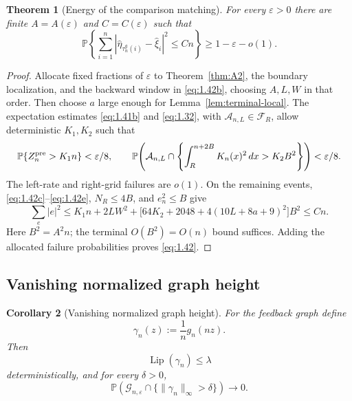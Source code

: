 \documentclass[11pt,reqno]{amsart}
\newtheorem{theorem}{Theorem}[section]
\newtheorem{corollary}[theorem]{Corollary}
\theoremstyle{definition}
\theoremstyle{remark}
\numberwithin{equation}{section}
\newcommand{\Pp}{\mathbb P}
\newcommand{\Lip}{\operatorname{Lip}}
\begin{document}
\begin{theorem}[Energy of the comparison matching]
\label{thm:I3}
For every \(\varepsilon>0\) there are finite
\(A=A(\varepsilon)\) and \(C=C(\varepsilon)\) such that
\begin{equation}
\boxed{\Pp\left\{\sum_{i=1}^n
|\widehat\eta_{\tau_n^g(i)}-\widehat\xi_i|^2\le Cn\right\}
\ge1-\varepsilon-o(1).}
\label{eq:1.42}
\end{equation}
\end{theorem}

\begin{proof}
Allocate fixed fractions of \(\varepsilon\) to Theorem~\ref{thm:A2},
the boundary localization,
and the backward window in \eqref{eq:1.42b}, choosing \(A,L,W\) in that order.
Then choose \(a\) large enough for Lemma~\ref{lem:terminal-local}.
The expectation estimates \eqref{eq:1.41b} and \eqref{eq:1.32}, with
\(\mathcal A_{n,L}\in\mathcal F_R\), allow deterministic \(K_1,K_2\) such that
\begin{equation}
\Pp\{Z_n^{\rm pre}>K_1n\}<\varepsilon/8,\qquad
\Pp\!\left(\mathcal A_{n,L}\cap
\left\{\int_R^{n+2B}K_n(x)^2\,dx>K_2B^2\right\}\right)<\varepsilon/8.
\label{eq:1.42e}
\end{equation}
The left-rate and right-grid failures are \(o(1)\).  On the remaining
events, \eqref{eq:1.42c}--\eqref{eq:1.42e}, \(N_R\le4B\), and \(e_n^2\le B\) give
\begin{equation}
\sum_e|e|^2\le K_1n+2LW^2+
\bigl[64K_2+2048+4(10L+8a+9)^2\bigr]B^2\le Cn.
\label{eq:1.42f}
\end{equation}
Here \(B^2=A^2n\); the terminal \(O(B^2)=O(n)\) bound suffices.
Adding the allocated failure probabilities proves \eqref{eq:1.42}.
\end{proof}

\subsection{Vanishing normalized graph height}

\begin{corollary}[Vanishing normalized graph height]
\label{cor:I4}
For the feedback graph define
\[
\gamma_n(z):=\frac1n g_n(nz).
\]
Then
\begin{equation}
\Lip(\gamma_n)\le\lambda
\label{eq:1.43}
\end{equation}
deterministically, and for every \(\delta>0\),
\begin{equation}
\Pp\left(
\mathcal G_{n,\varepsilon}\cap
\{\|\gamma_n\|_\infty>\delta\}
\right)\longrightarrow0.
\label{eq:1.44}
\end{equation}
\end{corollary}
\end{document}
